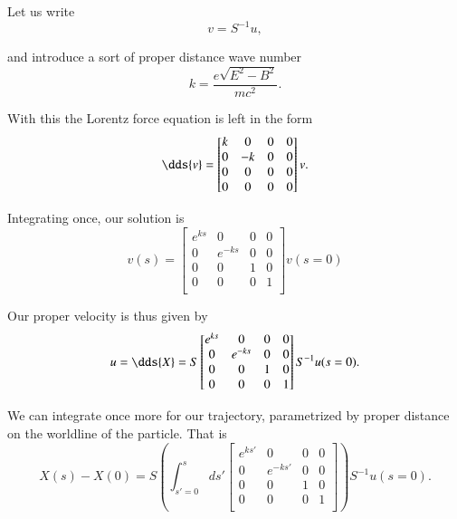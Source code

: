 {Let us write
%
\begin{equation}\label{eqn:relElectroDynProblemSet2:790}
v = S^{-1} u,
\end{equation}

and introduce a sort of proper distance wave number
%
\begin{equation}\label{eqn:relElectroDynProblemSet2:810}
k = \frac{e \sqrt{E^2 - B^2}}{m c^2}.
\end{equation}

With this the Lorentz force equation is left in the form
%
\begin{equation}\label{eqn:relElectroDynProblemSet2:830}
\dds{v} =
\begin{bmatrix}
k & 0 & 0 & 0 \\
0 & -k & 0 & 0 \\
0 & 0 & 0 & 0 \\
0 & 0 & 0 & 0 \\
\end{bmatrix} v.
\end{equation}

Integrating once, our solution is
%
\begin{equation}\label{eqn:relElectroDynProblemSet2:850}
v(s) =
\begin{bmatrix}
e^{ks} & 0 & 0 & 0 \\
0 & e^{-ks} & 0 & 0 \\
0 & 0 & 1 & 0 \\
0 & 0 & 0 & 1 \\
\end{bmatrix} v(s=0)
\end{equation}

Our proper velocity is thus given by
%
\begin{equation}\label{eqn:relElectroDynProblemSet2:870}
u = \dds{X} = S
\begin{bmatrix}
e^{ks} & 0 & 0 & 0 \\
0 & e^{-ks} & 0 & 0 \\
0 & 0 & 1 & 0 \\
0 & 0 & 0 & 1 \\
\end{bmatrix} S^{-1} u(s=0).
\end{equation}

We can integrate once more for our trajectory, parametrized by proper distance on the worldline of the particle.  That is
%
\begin{equation}\label{eqn:relElectroDynProblemSet2:890}
X(s) - X(0)
= S \left( \int_{s'=0}^s
ds'
\begin{bmatrix}
e^{ks'} & 0 & 0 & 0 \\
0 & e^{-ks'} & 0 & 0 \\
0 & 0 & 1 & 0 \\
0 & 0 & 0 & 1 \\
\end{bmatrix} \right) S^{-1} u(s=0).
\end{equation}

}
